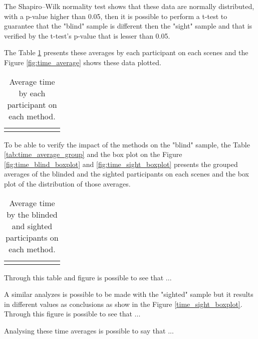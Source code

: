 The Shapiro–Wilk normality test shows that these data are normally distributed, with a p-value higher than 0.05, then it is possible to perform a t-test to guarantee that the "blind" sample is different then the "sight" sample and that is verified by the t-test's p-value that is lesser than 0.05.

The Table \ref{tab:time_average} presents these averages by each participant on each scenes and the Figure \ref{fig:time_average} shows these data plotted.

\begin{table}[!htb]
\centering
\caption{Average time by each participant on each method.}
\label{tab:time_average}
\begin{tabular}{lrrrrrr}
{}
\end{tabular}
\end{table}


To be able to verify the impact of the methods on the "blind" sample, the Table \ref{tab:time_average_group} and the box plot on the Figure \ref{fig:time_blind_boxplot} and \ref{fig:time_sight_boxplot} presents the grouped averages of the blinded and the sighted participants on each scenes and the box plot of the distribution of those averages. 

\begin{table}[!htb]
\centering
\caption{Average time by the blinded and sighted participants on each method.}
\label{tab:duration_average_group}
\begin{tabular}{lrrrrrr}
{}
\end{tabular}
\end{table}


Through this table and figure is possible to see that ...

A similar analyzes is possible to be made with the "sighted" sample but it results in different values as conclusions as show in the Figure \ref{time_sight_boxplot}. Through this figure is possible to see that ...


Analysing these time averages is possible to say that ...